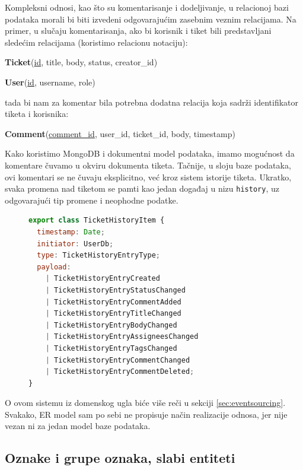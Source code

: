 \documentclass[12pt,oneside]{memoir}
\begin{document}
Kompleksni odnosi, kao što su komentarisanje i dodeljivanje, u relacionoj bazi podataka morali bi biti izvedeni odgovarajućim zasebnim veznim relacijama. Na primer, u slučaju komentarisanja, ako bi korisnik i tiket bili predstavljani sledećim relacijama (koristimo relacionu notaciju):

\begin{center}
\textbf{Ticket}(\underline{id}, title, body, status, creator\_id)    
\end{center}

\begin{center}
\textbf{User}(\underline{id}, username, role)    
\end{center}

tada bi nam za komentar bila potrebna dodatna relacija koja sadrži identifikator tiketa i korisnika:

\begin{center}
\textbf{Comment}(\underline{comment\_id}, user\_id, ticket\_id, body, timestamp)    
\end{center}

Kako koristimo MongoDB i dokumentni model podataka, imamo mogućnost da komentare čuvamo u okviru dokumenta tiketa. Tačnije, u sloju baze podataka, ovi komentari se ne čuvaju eksplicitno, već kroz sistem istorije tiketa. Ukratko, svaka promena nad tiketom se pamti kao jedan događaj u nizu \verb|history|, uz odgovarajući tip promene i neophodne podatke.

\begin{figure}[h]
\begin{lstlisting}[language=JavaScript, style=ES6, caption={Tip podataka istorije tiketa.}]
export class TicketHistoryItem {
  timestamp: Date;
  initiator: UserDb;
  type: TicketHistoryEntryType;
  payload:
    | TicketHistoryEntryCreated
    | TicketHistoryEntryStatusChanged
    | TicketHistoryEntryCommentAdded
    | TicketHistoryEntryTitleChanged
    | TicketHistoryEntryBodyChanged
    | TicketHistoryEntryAssigneesChanged
    | TicketHistoryEntryTagsChanged
    | TicketHistoryEntryCommentChanged
    | TicketHistoryEntryCommentDeleted;
}
\end{lstlisting}
\end{figure}

O ovom sistemu iz domenskog ugla biće više reči u sekciji \ref{sec:eventsourcing}. Svakako, ER model sam po sebi ne propisuje način realizacije odnosa, jer nije vezan ni za jedan model baze podataka.

\subsection{Oznake i grupe oznaka, slabi entiteti}
\end{document}
